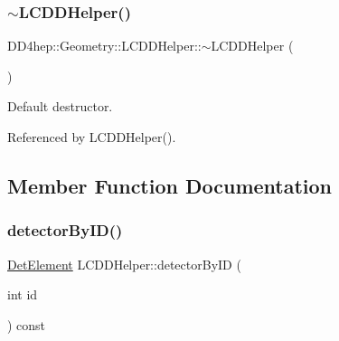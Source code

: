 \hypertarget{class_d_d4hep_1_1_geometry_1_1_l_c_d_d_helper_ac069c77f675ded9fc82ca22871ed8d67}{}\label{class_d_d4hep_1_1_geometry_1_1_l_c_d_d_helper_ac069c77f675ded9fc82ca22871ed8d67} 
\subsubsection{\texorpdfstring{$\sim$\+L\+C\+D\+D\+Helper()}{~LCDDHelper()}}
{\footnotesize\ttfamily D\+D4hep\+::\+Geometry\+::\+L\+C\+D\+D\+Helper\+::$\sim$\+L\+C\+D\+D\+Helper (\begin{DoxyParamCaption}{ }\end{DoxyParamCaption})\hspace{0.3cm}{\ttfamily [default]}}



Default destructor. 



Referenced by L\+C\+D\+D\+Helper().



\subsection{Member Function Documentation}
\hypertarget{class_d_d4hep_1_1_geometry_1_1_l_c_d_d_helper_a52f8567fe82f2fef171fb6898cab5d8b}{}\label{class_d_d4hep_1_1_geometry_1_1_l_c_d_d_helper_a52f8567fe82f2fef171fb6898cab5d8b} 
\subsubsection{\texorpdfstring{detector\+By\+I\+D()}{detectorByID()}}
{\footnotesize\ttfamily \hyperlink{class_d_d4hep_1_1_geometry_1_1_det_element}{Det\+Element} L\+C\+D\+D\+Helper\+::detector\+By\+ID (\begin{DoxyParamCaption}\item[{int}]{id }\end{DoxyParamCaption}) const}



